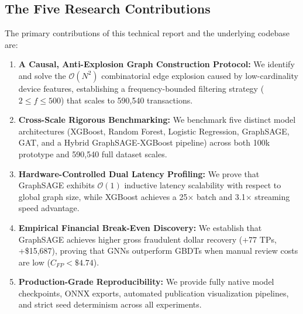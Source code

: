 \documentclass[11pt,a4paper]{report}
\begin{document}
\subsection{The Five Research Contributions}
The primary contributions of this technical report and the underlying codebase are:
\begin{enumerate}[leftmargin=*]
    \item \textbf{A Causal, Anti-Explosion Graph Construction Protocol:} We identify and solve the $\mathcal{O}(N^2)$ combinatorial edge explosion caused by low-cardinality device features, establishing a frequency-bounded filtering strategy ($2 \leq f \leq 500$) that scales to 590,540 transactions.
    \item \textbf{Cross-Scale Rigorous Benchmarking:} We benchmark five distinct model architectures (XGBoost, Random Forest, Logistic Regression, GraphSAGE, GAT, and a Hybrid GraphSAGE-XGBoost pipeline) across both 100k prototype and 590,540 full dataset scales.
    \item \textbf{Hardware-Controlled Dual Latency Profiling:} We prove that GraphSAGE exhibits $\mathcal{O}(1)$ inductive latency scalability with respect to global graph size, while XGBoost achieves a 25$\times$ batch and 3.1$\times$ streaming speed advantage.
    \item \textbf{Empirical Financial Break-Even Discovery:} We establish that GraphSAGE achieves higher gross fraudulent dollar recovery (+77 TPs, +\$15,687), proving that GNNs outperform GBDTs when manual review costs are low ($C_{FP} < \$4.74$).
    \item \textbf{Production-Grade Reproducibility:} We provide fully native model checkpoints, ONNX exports, automated publication visualization pipelines, and strict seed determinism across all experiments.
\end{enumerate}
\end{document}
